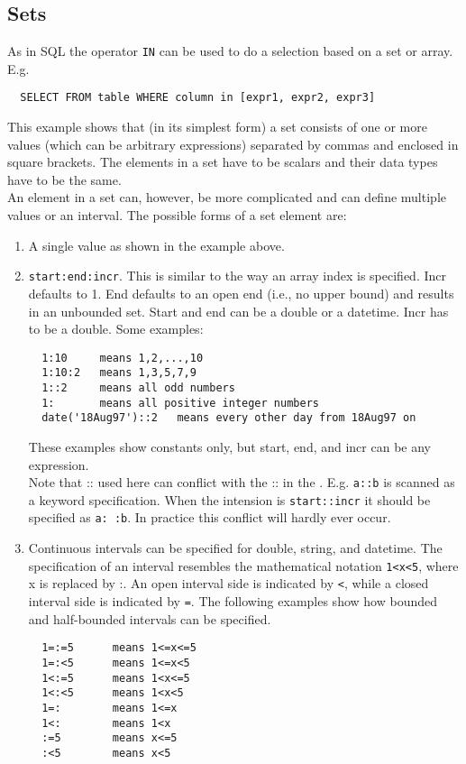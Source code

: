 \subsection{\label{TAQL:SETS}Sets}
As in SQL the operator \texttt{IN} can be used to do a selection
based on a set or array. E.g.
\begin{verbatim}
  SELECT FROM table WHERE column in [expr1, expr2, expr3]
\end{verbatim}
This example shows that (in its simplest form) a set
consists of one or more values (which
can be arbitrary expressions) separated by commas and enclosed in
square brackets. The elements in a set have to be scalars and their
data types have to be the same.
\\An element in a set can, however, be more complicated and can
define multiple values or an interval. The possible forms of
a set element are:
\begin{enumerate}
\item A single value as shown in the example above.
\item \texttt{start:end:incr}. This is similar to the
way an array index is specified. Incr defaults to 1.
End defaults to an open end (i.e., no upper bound) and results
in an unbounded set. Start and end can be a double or a datetime.
Incr has to be a double. Some examples:
\begin{verbatim}
  1:10     means 1,2,...,10
  1:10:2   means 1,3,5,7,9
  1::2     means all odd numbers
  1:       means all positive integer numbers
  date('18Aug97')::2   means every other day from 18Aug97 on
\end{verbatim}
These examples show constants only, but start, end, and incr can
be any expression.
\\Note that :: used here can conflict with the :: in the
. E.g. \texttt{a::b} is scanned as
a keyword specification. When the intension is \texttt{start::incr}
it should be specified as \texttt{a: :b}. In practice this conflict
will hardly ever occur.
\item Continuous intervals can be specified for double, string, and datetime.
The specification of an interval resembles the mathematical notation
\texttt{1<x<5}, where x is replaced by :. An open interval side
is indicated by \texttt{<}, while a closed interval side is indicated
by \texttt{=}.
The following examples show how bounded and half-bounded intervals
can be specified.
\begin{verbatim}
  1=:=5      means 1<=x<=5
  1=:<5      means 1<=x<5
  1<:=5      means 1<x<=5
  1<:<5      means 1<x<5
  1=:        means 1<=x
  1<:        means 1<x
  :=5        means x<=5
  :<5        means x<5
\end{verbatim}
\end{enumerate}

